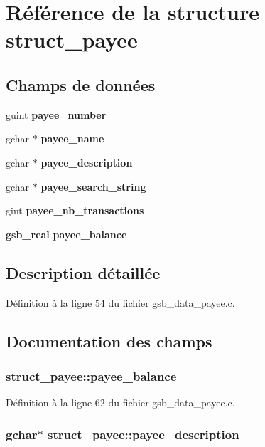 \section{Référence de la structure struct\_\-payee}
\label{structstruct__payee}
\subsection*{Champs de données}
\begin{DoxyCompactItemize}
\item 
guint {\bf payee\_\-number}
\item 
gchar $\ast$ {\bf payee\_\-name}
\item 
gchar $\ast$ {\bf payee\_\-description}
\item 
gchar $\ast$ {\bf payee\_\-search\_\-string}
\item 
gint {\bf payee\_\-nb\_\-transactions}
\item 
{\bf gsb\_\-real} {\bf payee\_\-balance}
\end{DoxyCompactItemize}


\subsection{Description détaillée}


Définition à la ligne 54 du fichier gsb\_\-data\_\-payee.c.



\subsection{Documentation des champs}
\subsubsection[{payee\_\-balance}]{ {\bf struct\_\-payee::payee\_\-balance}}\label{structstruct__payee_aee0413f2ff54904244b1b28eea368033}


Définition à la ligne 62 du fichier gsb\_\-data\_\-payee.c.

\subsubsection[{payee\_\-description}]{\setlength{\rightskip}{0pt plus 5cm}gchar$\ast$ {\bf struct\_\-payee::payee\_\-description}}\label{structstruct__payee_a6e4286756603721bcefb2a0518019eb5}


